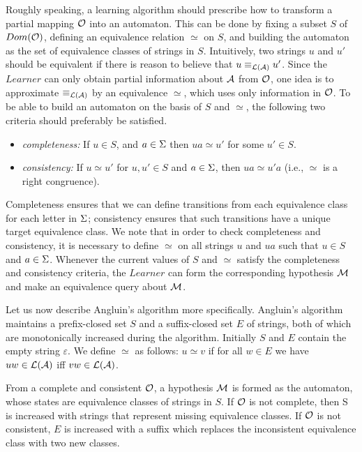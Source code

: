 Roughly speaking, a learning algorithm should prescribe how to transform
a partial mapping $\mathcal{O}$ into an automaton.
This can be done by fixing a subset $S$ of 
$Dom(\mathcal{O})$, defining 
an equivalence relation $\simeq$ on $S$, and
building the automaton as the set of equivalence classes of strings
in $S$. Intuitively, two strings $u$ and $u'$
should be equivalent if there is reason to believe that
$u \equiv_{\mathcal{L}({\cal A})} u'$. Since the $Learner$ can only obtain partial
information about ${\cal A}$ from $\mathcal{O}$,
one idea is to approximate $\equiv_{\mathcal{L}({\cal A})}$ by an equivalence
$\simeq$, which uses only information in $\mathcal{O}$. 
To be able to build an automaton on the basis of $S$ and
$\simeq$,
the following two criteria should preferably be satisfied.
\begin{itemize}
\item {\em completeness:} If $u \in S$, and $a \in \Sigma$ then 
$ua \simeq u'$ for some $u' \in S$.
\item {\em consistency:} If $u \simeq u'$ for $u,u' \in S$ and
$a \in \Sigma$, then $ua \simeq u'a$ (i.e., $\simeq$ is a right
congruence).
\end{itemize}
Completeness ensures that we can define transitions from
each equivalence class for each letter in $\Sigma$;
consistency ensures that such transitions have a unique target
equivalence class.
We note that in order to check completeness and consistency, it is necessary
to define $\simeq$ on all strings $u$ and $ua$ such that
$u \in S$ and $a \in \Sigma$.
Whenever the current
values of $S$ and $\simeq$ satisfy the completeness and consistency
criteria, the $Learner$ can form the corresponding 
hypothesis ${\cal M}$ and make an equivalence query about ${\cal M}$.

Let us now describe Angluin's algorithm more specifically.  Angluin's
algorithm maintains a prefix-closed set $S$ and a suffix-closed set $E$ of
strings, both of which are monotonically increased during the
algorithm. Initially $S$ and $E$ contain the empty string $\varepsilon$.
We define $\simeq$ as follows: $u \simeq v$ if
for all $w \in E$ we have $uw \in \mathcal{L}({\cal A})$ iff $vw \in
\mathcal{L}({\cal A})$.

From a complete and consistent $\mathcal{O}$, a hypothesis ${\cal M}$
is formed as the automaton, whose states are equivalence classes of
strings in $S$.
If $\mathcal{O}$ is not complete, then S is increased with
strings that represent missing equivalence classes.
If $\mathcal{O}$ is not consistent, $E$ is increased with a suffix
which replaces the inconsistent equivalence class with two new classes.

